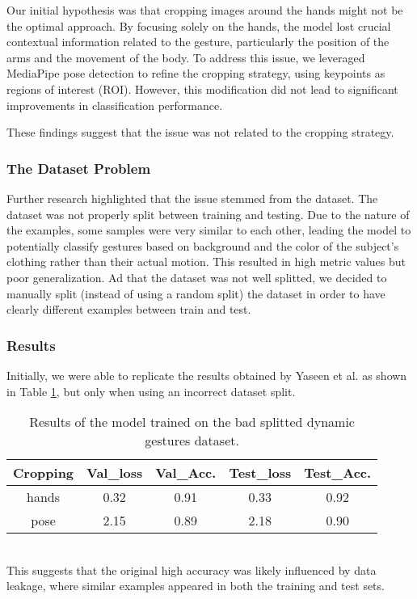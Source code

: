 \documentclass[10pt,twocolumn,letterpaper]{article}
\begin{document}
Our initial hypothesis was that cropping images around the hands might not be the optimal approach. By focusing solely on the hands, the model lost crucial contextual information related to the gesture, particularly the position of the arms and the movement of the body.
To address this issue, we leveraged MediaPipe pose detection to refine the cropping strategy, using keypoints as regions of interest (ROI). However, this modification did not lead to significant improvements in classification performance.  

These findings suggest that the issue was not related to the cropping strategy.  

\subsubsection{The Dataset Problem}
Further research highlighted that the issue stemmed from the dataset. The dataset was not properly split between training and testing.  
Due to the nature of the examples, some samples were very similar to each other, leading the model to potentially classify gestures based on background and the color of the subject’s clothing rather than their actual motion.  
This resulted in high metric values but poor generalization.  
Ad that the dataset was not well splitted, we decided to manually split (instead of using a random split) the dataset in order to have clearly different examples between train and test.

\subsubsection{Results}
Initially, we were able to replicate the results obtained by Yaseen et al. \cite{electronics13163233}
as shown in Table \ref{tab:dynamicGesturesBad}, but only when using an incorrect dataset split.  
\begin{table}[h]
   \begin{center}
   \begin{tabular}{|c|c|c|c|c|}
   \hline
   \textbf{Cropping} & \textbf{Val\_loss} & \textbf{Val\_Acc.} & \textbf{Test\_loss} & \textbf{Test\_Acc.}\\
   \hline\hline
   hands & 0.32 & 0.91 & 0.33 & 0.92 \\
   pose & 2.15 & 0.89 & 2.18 & 0.90 \\
   \hline
   \end{tabular}
   \end{center}
   \caption{Results of the model trained on the bad splitted dynamic gestures dataset.}
   \label{tab:dynamicGesturesBad}
\end{table} \\
This suggests that the original high accuracy was likely influenced by data leakage, where similar examples appeared in both the training and test sets. 
\end{document}
